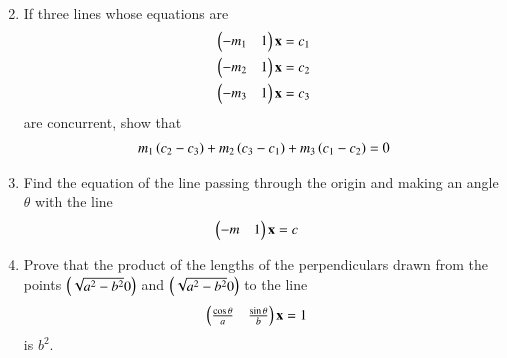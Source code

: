 \begin{enumerate}[label=\arabic*.,ref=\thesubsection.\theenumi]
\begin{align}
\end{align}
%
\item If three lines whose equations are 
%
\begin{align}
\begin{pmatrix}-m_1 & 1\end{pmatrix}\mathbf{x} &= c_1
\\
\begin{pmatrix}-m_2 & 1\end{pmatrix}\mathbf{x} &= c_2
\\
\begin{pmatrix}-m_3 & 1\end{pmatrix}\mathbf{x} &= c_3
\end{align}
%
are concurrent, show that
%
\begin{align}
m_1\left(c_2-c_3\right)+
m_2\left(c_3-c_1\right)+
m_3\left(c_1-c_2\right) = 0
\end{align}
%
\item Find the equation of the line passing through the origin and making an angle $\theta$ with the line %
\begin{align}
\begin{pmatrix}-m & 1\end{pmatrix}\mathbf{x} &= c
\end{align}
%
\item Prove that the product of the lengths of the perpendiculars drawn from the points $\begin{pmatrix}\sqrt{a^2-b^2}0\end{pmatrix}$ and $\begin{pmatrix}\sqrt{a^2-b^2}0\end{pmatrix}$ to the line 
%
\begin{align}
\begin{pmatrix}\frac{\cos\theta}{a} & \frac{\sin\theta}{b}\end{pmatrix}\mathbf{x} &= 1
\end{align}
%
is $b^2$.


\end{enumerate}
